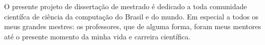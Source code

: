 O presente projeto de dissertação de mestrado é dedicado a toda comunidade
científca de ciência da computação do Brasil e do mundo. 
Em especial a todos os meus grandes mestres: os professores, que de alguma
forma, foram meus mentores até o presente momento da minha vida e carreira 
científica.
